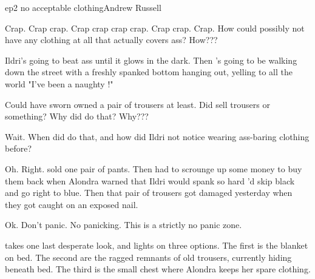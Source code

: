 \documentclass{book}
\begin{document}
\begin{childnode}{ep2 no acceptable clothing}{Andrew Russell}

    Crap. Crap crap. Crap crap crap crap. Crap crap. Crap. How could \heshe{} possibly not have any clothing at all that actually covers \hisher{} ass? How??? 

    Ildri's going to beat \hisher{} ass until it glows in the dark. Then \heshe{}'s going to be walking down the street with a freshly spanked bottom hanging out, yelling to all the world 
    "I've been a naughty \boygirl{}!"

    Could have sworn \heshe{} owned a pair of trousers at least. Did \heshe{} sell \hisher{} trousers or something? Why did \heshe{} do that? Why??? 

    Wait. When did \heshe{} do that, and how did Ildri not notice \himher{} wearing ass-baring clothing before?

    Oh. Right. \HeShe{} sold one pair of pants. Then \heshe{} had to scrounge up some money to buy them back when Alondra warned \himher{} that Ildri would spank \himher{} so hard \heshe{}'d skip
    black and go right to blue. Then that pair of trousers got damaged yesterday when they got caught on an exposed nail.

    Ok. Don't panic. No panicking. This is a strictly no panic zone.

    \names{} takes one last desperate look, and lights on three options. The first is the blanket on \hisher{} bed. The second are the ragged remnants of \names{} old trousers, currently hiding 
    beneath
    \hisher{} bed. The third is the small chest where Alondra keeps her spare clothing.




\end{childnode}
\end{document}
